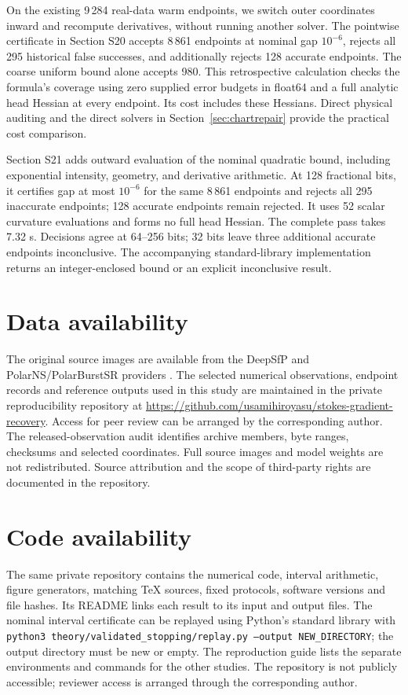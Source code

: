\documentclass[10pt,a4paper]{article}
\begin{document}
On the existing 9\,284 real-data warm endpoints, we switch outer coordinates inward and recompute derivatives, without running another solver. The pointwise certificate in Section S20 accepts 8\,861 endpoints at nominal gap $10^{-6}$, rejects all 295 historical false successes, and additionally rejects 128 accurate endpoints. The coarse uniform bound alone accepts 980. This retrospective calculation checks the formula's coverage using zero supplied error budgets in float64 and a full analytic head Hessian at every endpoint. Its cost includes these Hessians. Direct physical auditing and the direct solvers in Section~\ref{sec:chartrepair} provide the practical cost comparison.

Section S21 adds outward evaluation of the nominal quadratic bound, including exponential intensity, geometry, and derivative arithmetic. At 128 fractional bits, it certifies gap at most $10^{-6}$ for the same 8\,861 endpoints and rejects all 295 inaccurate endpoints; 128 accurate endpoints remain rejected. It uses 52 scalar curvature evaluations and forms no full head Hessian. The complete pass takes 7.32 s. Decisions agree at 64--256 bits; 32 bits leave three additional accurate endpoints inconclusive. The accompanying standard-library implementation returns an integer-enclosed bound or an explicit inconclusive result.

\section*{Data availability}
The original source images are available from the DeepSfP and PolarNS/PolarBurstSR providers \cite{ba,polarns}. The selected numerical observations, endpoint records and reference outputs used in this study are maintained in the private reproducibility repository at \url{https://github.com/usamihiroyasu/stokes-gradient-recovery}. Access for peer review can be arranged by the corresponding author. The released-observation audit identifies archive members, byte ranges, checksums and selected coordinates. Full source images and model weights are not redistributed. Source attribution and the scope of third-party rights are documented in the repository.

\section*{Code availability}
The same private repository contains the numerical code, interval arithmetic, figure generators, matching TeX sources, fixed protocols, software versions and file hashes. Its README links each result to its input and output files. The nominal interval certificate can be replayed using Python's standard library with \texttt{python3 theory/validated\_stopping/replay.py --output NEW\_DIRECTORY}; the output directory must be new or empty. The reproduction guide lists the separate environments and commands for the other studies. The repository is not publicly accessible; reviewer access is arranged through the corresponding author.
\end{document}
